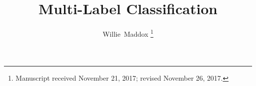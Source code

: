 \documentclass[12pt,journal,compsoc]{IEEEtran}
\begin{document}
%
\title{Multi-Label Classification}
%
%
%
%

\author{Willie~Maddox%
\thanks{Manuscript received November 21, 2017; revised November 26, 2017.}}

% 
%
\end{document}
